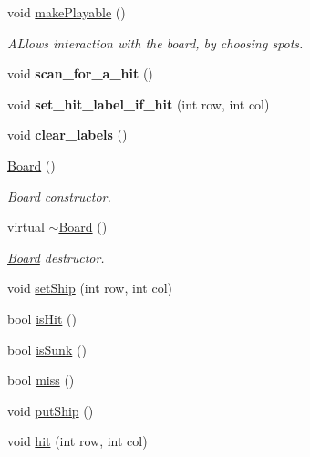 \begin{DoxyCompactItemize}
\mbox{\label{classBoard_a40970d4d68fcc22da52b0611c11b857a}} 
void \mbox{\hyperlink{classBoard_a40970d4d68fcc22da52b0611c11b857a}{make\+Playable}} ()
\begin{DoxyCompactList}\small\item\em A\+Llows interaction with the board, by choosing spots. \end{DoxyCompactList}\item 
\mbox{\label{classBoard_a6fcde3aa9b0fae10e8f787f1425c7c67}} 
void {\bfseries scan\+\_\+for\+\_\+a\+\_\+hit} ()
\item 
\mbox{\label{classBoard_aa5f2bc4fd029d3efc5463d882441b85b}} 
void {\bfseries set\+\_\+hit\+\_\+label\+\_\+if\+\_\+hit} (int row, int col)
\item 
\mbox{\label{classBoard_a0bfa16413db8524b2156e6786e0531a2}} 
void {\bfseries clear\+\_\+labels} ()
\item 
\mbox{\hyperlink{classBoard_a9ee491d4fea680cf69b033374a9fdfcb}{Board}} ()
\begin{DoxyCompactList}\small\item\em \mbox{\hyperlink{classBoard}{Board}} constructor. \end{DoxyCompactList}\item 
virtual \mbox{\hyperlink{classBoard_a2fba9e5428840eb48645c078b9f0dcce}{$\sim$\+Board}} ()
\begin{DoxyCompactList}\small\item\em \mbox{\hyperlink{classBoard}{Board}} destructor. \end{DoxyCompactList}\item 
void \mbox{\hyperlink{classBoard_ac91459b71b1d94be33fe02bcb21c182e}{set\+Ship}} (int row, int col)
\item 
bool \mbox{\hyperlink{classBoard_a785d6203e06e8d588c88574c34feff7c}{is\+Hit}} ()
\item 
bool \mbox{\hyperlink{classBoard_a242488b02ce0a370c7648df567aa7ec0}{is\+Sunk}} ()
\item 
bool \mbox{\hyperlink{classBoard_a058b6c42434ce8f8f313cc78ebcaac74}{miss}} ()
\item 
void \mbox{\hyperlink{classBoard_a92231a5cc243d7a7901c5e72ce289eb9}{put\+Ship}} ()
\item 
void \mbox{\hyperlink{classBoard_abbbcf159450dc2114a00936452b15cad}{hit}} (int row, int col)
\end{DoxyCompactItemize}
